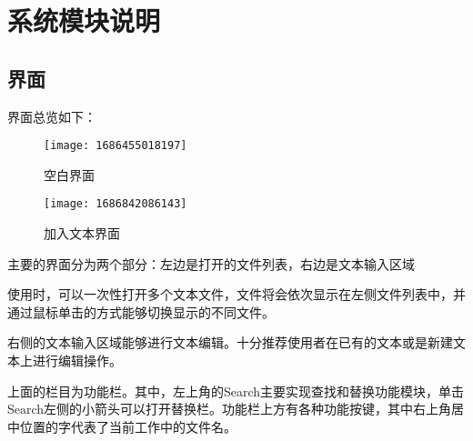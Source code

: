 \documentclass{./source/Report}
\begin{document}

\section{系统模块说明}
\subsection{界面}
界面总览如下：
\begin{figure}[!htbp]
    \begin{minipage}{0.45\textwidth}
        \centering
        \texttt{[image: 1686455018197]}
        \caption{空白界面}
    \end{minipage}
    \begin{minipage}{0.45\textwidth}
        \centering
        \texttt{[image: 1686842086143]}
        \caption{加入文本界面}
    \end{minipage}
\end{figure}

主要的界面分为两个部分：左边是打开的文件列表，右边是文本输入区域\par
使用时，可以一次性打开多个文本文件，文件将会依次显示在左侧文件列表中，并通过鼠标单击的方式能够切换显示的不同文件。\par
右侧的文本输入区域能够进行文本编辑。十分推荐使用者在已有的文本或是新建文本上进行编辑操作。\par
上面的栏目为功能栏。其中，左上角的Search主要实现查找和替换功能模块，单击Search左侧的小箭头可以打开替换栏。功能栏上方有各种功能按键，其中右上角居中位置的字代表了当前工作中的文件名。
\end{document}
